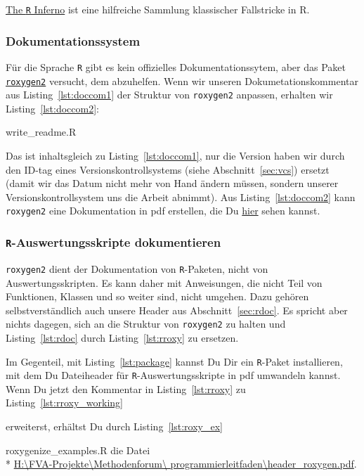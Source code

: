 \documentclass[twoside]{scrartcl}
\providecommand{\R}{\texttt{R}}
\providecommand{\code}[1]{\texttt{#1}}
\providecommand{\proot}{%
H:\textbackslash{}FVA-Projekte\textbackslash{}Methodenforum\textbackslash{}%
}
\providecommand{\pdir}{\proot{}programmierleitfaden\textbackslash{}}
\begin{document}
\href{http://www.burns-stat.com/pages/Tutor/R_inferno.pdf}{The \R{} Inferno} ist
eine hilfreiche Sammlung klassischer Fallstricke in R. 

\subsubsection{Dokumentationssystem}
F\"u{}r die Sprache \R{}
gibt es kein offizielles Dokumentationssytem, aber 
das Paket \href{http://cran.r-project.org/web/packages/roxygen2/index.html}
{\code{roxygen2}} versucht, dem abzuhelfen. 
Wenn wir unseren Dokumetationskommentar aus Listing~\ref{lst:doccom1} der 
Struktur von \code{roxygen2} anpassen, erhalten wir Listing~\ref{lst:doccom2}:

%
{write_readme.R}

Das ist inhaltsgleich zu  Listing~\ref{lst:doccom1}, nur die Version haben wir 
durch den ID-tag eines Versionskontrollsystems (siehe Abschnitt~\ref{sec:vcs}) 
ersetzt (damit wir das Datum nicht mehr von Hand
\"a{}ndern m\"u{}ssen, sondern unserer Versionskontrollsystem uns die Arbeit
abnimmt).
Aus Listing~\ref{lst:doccom2}  kann \code{roxygen2} eine Dokumentation in pdf 
erstellen, die Du \href{write_readme.pdf}{hier} sehen kannst.

\subsubsection{\R{}-Auswertungsskripte dokumentieren
\label{sec:roxygen2ForSingleFiles}}
\code{roxygen2} dient der Dokumentation von \R{}-Paketen, nicht von
Auswertungsskripten. Es kann daher mit Anweisungen, die nicht Teil von
Funktionen, Klassen und so weiter sind, nicht umgehen. Dazu geh\"oren
selbstverst\"a{}ndlich auch unsere Header aus Abschnitt~\ref{sec:rdoc}.
Es spricht aber nichts dagegen, sich an die Struktur von \code{roxygen2} zu
halten und Listing~\ref{lst:rdoc} durch Listing~\ref{lst:rroxy} zu ersetzen.


Im Gegenteil, mit Listing~\ref{lst:package} kannst Du Dir ein \R{}-Paket
installieren, mit dem Du 
Dateiheader 
f\"u{}r \R{}-Auswertungsskripte in pdf 
umwandeln
kannst.
Wenn Du jetzt den Kommentar in  Listing~\ref{lst:rroxy} zu
Listing~\ref{lst:rroxy_working} 

erweiterst, erh\"altst Du durch
Listing~\ref{lst:roxy_ex} 

{roxygenize_examples.R} die Datei \\*
\href{%
header_roxygen.pdf}{%
\pdir{}header\_roxygen.pdf}.  
\end{document}
